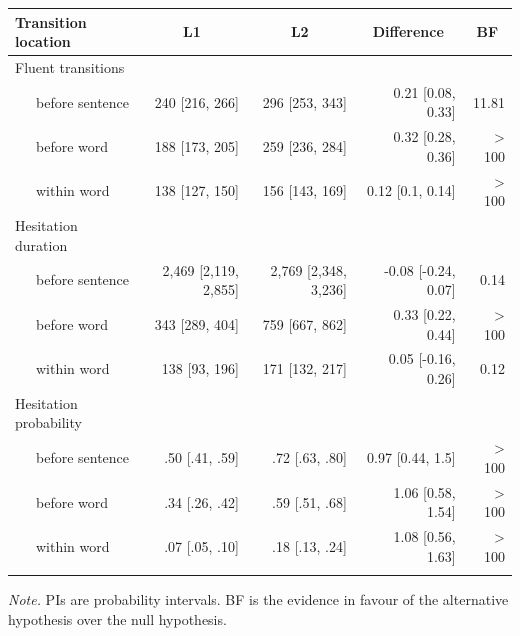 \documentclass[
  english,
  man,floatsintext]{apa7}
\begin{document}
\begin{appendix}
\begin{table}[tbp]
\begin{center}
\begin{threeparttable}
{\begin{tabular}{lrrrr}
\toprule
Transition location & \multicolumn{1}{c}{L1} & \multicolumn{1}{c}{L2} & \multicolumn{1}{c}{Difference} & \multicolumn{1}{c}{BF}\\
\midrule
Fluent transitions &  &  &  & \\
\ \ \ before sentence & 240 [216, 266] & 296 [253, 343] & 0.21 [0.08, 0.33] & 11.81\\
\ \ \ before word & 188 [173, 205] & 259 [236, 284] & 0.32 [0.28, 0.36] & > 100\\
\ \ \ within word & 138 [127, 150] & 156 [143, 169] & 0.12 [0.1, 0.14] & > 100\\
Hesitation duration &  &  &  & \\
\ \ \ before sentence & 2,469 [2,119, 2,855] & 2,769 [2,348, 3,236] & -0.08 [-0.24, 0.07] & 0.14\\
\ \ \ before word & 343 [289, 404] & 759 [667, 862] & 0.33 [0.22, 0.44] & > 100\\
\ \ \ within word & 138 [93, 196] & 171 [132, 217] & 0.05 [-0.16, 0.26] & 0.12\\
Hesitation probability &  &  &  & \\
\ \ \ before sentence & .50 [.41, .59] & .72 [.63, .80] & 0.97 [0.44, 1.5] & > 100\\
\ \ \ before word & .34 [.26, .42] & .59 [.51, .68] & 1.06 [0.58, 1.54] & > 100\\
\ \ \ within word & .07 [.05, .10] & .18 [.13, .24] & 1.08 [0.56, 1.63] & > 100\\
\bottomrule
\addlinespace
\end{tabular}

}

\begin{tablenotes}[para]
\normalsize{\textit{Note.} PIs are probability intervals. BF is the evidence in favour of the alternative hypothesis over the null hypothesis.}
\end{tablenotes}

\end{threeparttable}
\end{center}

\end{table}
\end{appendix}

\clearpage
\makeatletter
\efloat@restorefloats
\makeatother
\end{document}
